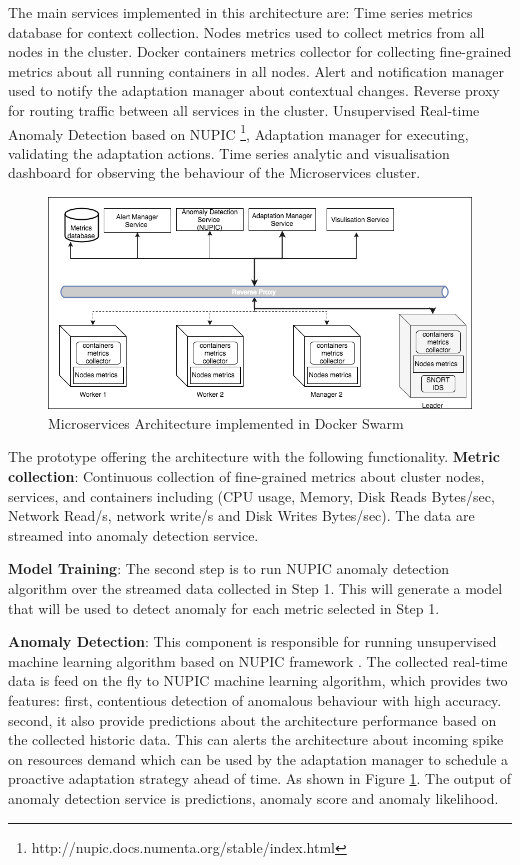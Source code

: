 \documentclass[sigconf]{acmart}
\begin{document}
The main services implemented in this architecture are: Time series metrics database for context collection. Nodes metrics used to collect metrics from all nodes in the cluster. Docker containers metrics collector for collecting fine-grained metrics about all running containers in all nodes. Alert and notification manager used to notify the adaptation manager about contextual changes. Reverse proxy for routing traffic between all services in the cluster. Unsupervised Real-time Anomaly Detection based on NUPIC \footnote{http://nupic.docs.numenta.org/stable/index.html}, Adaptation manager for executing, validating the adaptation actions. Time series analytic and visualisation dashboard for observing the behaviour of the Microservices cluster. 
 
\begin{figure}[ht!] 
\includegraphics[scale=0.4]{design}
\caption{Microservices Architecture implemented in Docker Swarm}
\label{fig_model}
\end{figure}


The prototype offering the architecture with the following functionality. \textbf{Metric collection}: Continuous collection of fine-grained metrics about cluster nodes, services, and containers including (CPU usage, Memory, Disk Reads Bytes/sec, Network Read/s, network write/s and Disk Writes Bytes/sec). The data are streamed into anomaly detection service. 

\textbf{Model Training}: The second step is to run NUPIC anomaly detection algorithm over the streamed data collected in Step 1. This will generate a model that will be used to detect anomaly for each metric selected in Step 1. 

\textbf{Anomaly Detection}: This component is responsible for running unsupervised machine learning algorithm based on NUPIC framework \cite{AHMAD2017134}. The collected real-time data is feed on the fly to NUPIC machine learning algorithm, which provides two features: first, contentious detection of anomalous behaviour with high accuracy. second, it also provide predictions about the architecture performance based on the collected historic data. This can alerts the architecture about incoming spike on resources demand which can be used by the adaptation manager to schedule a proactive adaptation strategy ahead of time. As shown in Figure \ref{fig_model}. The output of anomaly detection service is predictions, anomaly score and anomaly likelihood. 
\end{document}
